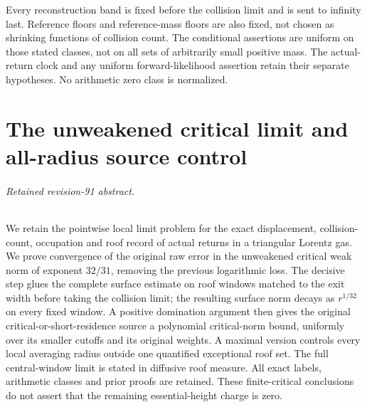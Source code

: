 \documentclass[11pt,reqno]{amsart}
\numberwithin{equation}{section}
\theoremstyle{definition}\newtheorem{definition}[theorem]{Definition}
\theoremstyle{remark}\newtheorem{remark}[theorem]{Remark}
\theoremstyle{definition}\newtheorem{inputstatement}[theorem]{Input statement}
\begin{document}
Every reconstruction band is fixed before the collision limit and is
sent to infinity last. Reference floors and reference-mass floors are
also fixed, not chosen as shrinking functions of collision count.
The conditional assertions are uniform on those stated classes, not on
all sets of arbitrarily small positive mass. The actual-return clock
and any uniform forward-likelihood assertion retain their separate
hypotheses. No arithmetic zero class is normalized.

\appendix


\endgroup
\part{The unweakened critical limit and all-radius source control}
\begingroup
\let\ArchiveLabel\label
\let\ArchiveRef\ref
\renewcommand{\label}[1]{\ArchiveLabel{v91archive:#1}}
\renewcommand{\ref}[1]{%
  \IfBeginWith{#1}{supp-}{%
    \StrBehind{#1}{supp-}[\ArchiveTarget]%
    \ArchiveRef{\ArchiveTarget}%
  }{\ArchiveRef{v91archive:#1}}%
}
\makeatletter
\let\ltx@label\label
\makeatother
\paragraph{Retained revision-91 abstract.}

We retain the pointwise local limit problem for the exact displacement,
collision-count, occupation and roof record of actual returns in a
triangular Lorentz gas. We prove convergence of the original raw error
in the unweakened critical weak norm of exponent $32/31$, removing the
previous logarithmic loss. The decisive step glues the complete surface
estimate on roof windows matched to the exit width before taking the
collision limit; the resulting surface norm decays as $r^{1/32}$ on
every fixed window. A positive domination argument then gives the
original critical-or-short-residence source a polynomial critical-norm
bound, uniformly over its smaller cutoffs and its original weights.
A maximal version controls every local averaging radius outside one
quantified exceptional roof set. The full central-window limit is
stated in diffusive roof measure. All exact labels, arithmetic classes
and prior proofs are retained. These finite-critical conclusions do
not assert that the remaining essential-height charge is zero.




\end{document}
